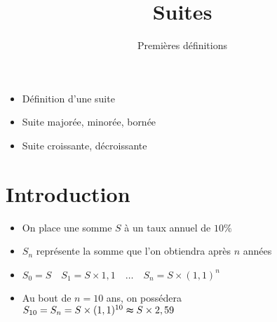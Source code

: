 





\title{{\bf Suites}}
\subtitle{Premières définitions}




\begin{frame}
  
  \debutmontitre

  \pause

{\footnotesize
\hfill
{}
\begin{minipage}{0.6\textwidth}
  \begin{itemize}
    \item<3-> Définition d'une suite
    \item<4-> Suite majorée, minorée, bornée
    \item<5-> Suite croissante, décroissante
  \end{itemize}
\end{minipage}
}

\end{frame}
\setcounter{framenumber}{0}

\section*{Introduction}

\begin{frame}


\begin{itemize}
  \item On place une somme $S$ à un taux annuel de $10\%$

\pause
\medskip

  \item $S_n$ représente la somme que l'on obtiendra après $n$ années
 
\pause
\medskip

  \item $S_0=S \quad    S_1=S\times 1,1\quad \ldots \quad   S_n=S\times (1,1)^n$
 
\pause
\medskip

  \item Au bout de $n=10$ ans, on possédera \\ \medskip
  \hfil $S_{10}=S_n=S\times (1,1)^{10}\thickapprox S\times 2,59$
      
\end{itemize}
\end{frame}

